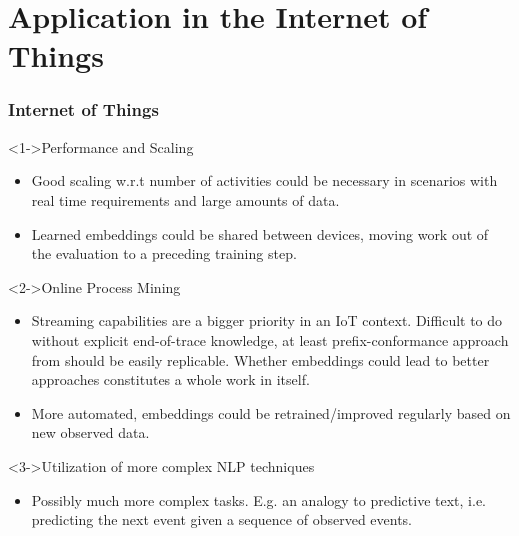 \documentclass{beamer}
\begin{document}
	\section{Application in the Internet of Things}
	\begin{frame}
		\frametitle{Internet of Things}
		\begin{block}<1->{Performance and Scaling}
			\begin{itemize}
				\item Good scaling w.r.t number of activities could be necessary in scenarios with real time requirements and large amounts of data.
				\item Learned embeddings could be shared between devices, moving work out of the evaluation to a preceding training step.
			\end{itemize}
		\end{block}
	
	\begin{block}<2->{Online Process Mining}
		\begin{itemize}
			\item Streaming capabilities are a bigger priority in an IoT context. Difficult to do without explicit end-of-trace knowledge, at least prefix-conformance approach from \cite{ZBK*19} should be easily replicable. Whether embeddings could lead to better approaches constitutes a whole work in itself.
			\item More automated, embeddings could be retrained/improved regularly based on new observed data.  
		\end{itemize}
	\end{block}

\begin{block}<3->{Utilization of more complex NLP techniques}
	\begin{itemize}
		\item Possibly much more complex tasks. E.g. an analogy to predictive text, i.e. predicting the next event given a sequence of observed events.
	\end{itemize}
\end{block}
	\end{frame}
\end{document}
